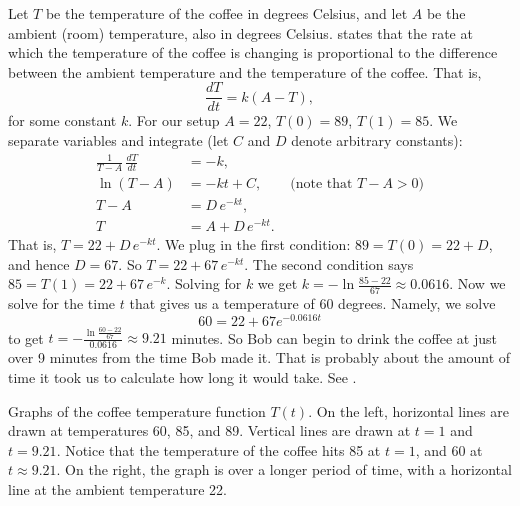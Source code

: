 \begin{example}
Let $T$ be the temperature of the coffee in degrees Celsius, and let $A$ be
the ambient (room) temperature, also in degrees Celsius.
 states that the rate at which the
temperature of the coffee is changing
is proportional to the difference between the
ambient temperature and the temperature of the coffee.  That is,
\begin{equation*}
\frac{dT}{dt} = k(A-T) ,
\end{equation*}
for some constant $k$.
For our setup $A=22$, $T(0) = 89$, $T(1) = 85$.
We separate variables and integrate (let $C$ and $D$ denote arbitrary
constants):
\begin{align*}
\frac{1}{T-A} \, \frac{dT}{dt} & = -k , \\
\ln (T-A) &= -kt + C , \qquad \text{(note that } T-A > 0 \text{)} \\
T-A &= D\, e^{-kt} ,  \\
T &= A + D\, e^{-kt} .
\end{align*}
That is,
$T = 22 + D\, e^{-kt}$.  We plug in the first condition: $89 = T(0) = 22 +
D$,
and hence $D = 67$.  So
$T = 22 + 67\, e^{-kt}$.  The second condition says $85 = T(1) = 
22 + 67\, e^{-k}$.  Solving for $k$ we get
$k = - \ln \frac{85-22}{67} \approx 0.0616$.  Now we solve for the time $t$
that gives us a temperature of 60 degrees.  Namely, we solve
\begin{equation*}
60 = 22 + 67 e^{-0.0616t}
\end{equation*}
to get
$t = - \frac{\ln \frac{60-22}{67}}{0.0616} \approx 9.21$ minutes.  So Bob can
begin to drink the coffee at just over 9 minutes from the time Bob made
it.  That is probably about the amount of time it took us to calculate how long
it would take.  See .
\begin{myfig}
\capstart
\caption{Graphs of the coffee temperature function $T(t)$.
On the left, horizontal
lines are drawn at temperatures 60, 85, and 89.  Vertical lines
are drawn at $t=1$ and $t=9.21$.  Notice that the
temperature of the coffee hits 85 at $t=1$, and 60 at
$t \approx 9.21$.  On the right, the graph is over a longer period of time,
with a horizontal line at the ambient temperature 22.\label{sintro:coffeefig}}
\end{myfig}
\end{example}

